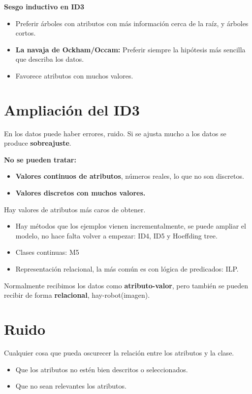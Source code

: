 \documentclass[12pt, twoside, openright]{report} %
\begin{document}
\textbf{Sesgo inductivo en ID3}

\begin{itemize}
	\item Preferir árboles con atributos con más información cerca de la raíz, y
	      árboles cortos.
	\item \textbf{La navaja de Ockham/Occam:} Preferir siempre la hipótesis más
	      sencilla que describa los datos.
	\item Favorece atributos con muchos valores.
\end{itemize}

\section{Ampliación del ID3}

En los datos puede haber errores, ruido. Si se ajusta mucho a los datos
se produce \textbf{sobreajuste}.

\textbf{No se pueden tratar:}

\begin{itemize}
	\item \textbf{Valores continuos de atributos}, números reales, lo que no son
	      discretos.
	\item \textbf{Valores discretos con muchos valores.}
\end{itemize}

Hay valores de atributos más caros de obtener.

\begin{itemize}
	\item Hay métodos que los ejemplos vienen incrementalmente, se puede ampliar el modelo, no hace falta volver a empezar: ID4, ID5 y Hoeffding tree.
	\item Clases continuas: M5
	\item Representación relacional, la más común es con lógica de predicados:
	      ILP.
\end{itemize}

Normalmente recibimos los datos como \textbf{atributo-valor}, pero
también se pueden recibir de forma \textbf{relacional}, hay-robot(imagen).

\section{Ruido}

Cualquier cosa que pueda oscurecer la relación entre los atributos y la
clase.

\begin{itemize}
	\item Que los atributos no estén bien descritos o seleccionados.
	\item Que no sean relevantes los atributos.
\end{itemize}
\end{document}
